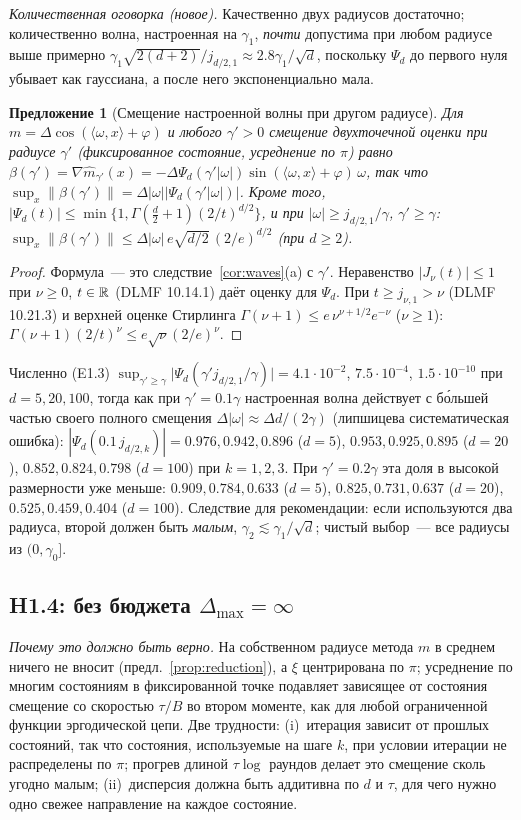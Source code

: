 \documentclass[11pt,a4paper]{article}
\numberwithin{equation}{section}
\newtheorem{proposition}[theorem]{Предложение}
\theoremstyle{definition}
\theoremstyle{remark}
\newcommand{\norm}[1]{\lVert #1\rVert}\newcommand{\abs}[1]{\lvert #1\rvert}\newcommand{\ip}[2]{\langle #1,#2\rangle}
\newcommand{\Dmax}{\Delta_{\max}}\newcommand{\Dcp}{\Delta_{\rm cp}}
\begin{document}
\emph{Количественная оговорка (новое).} Качественно двух радиусов достаточно; количественно волна, настроенная на $\gamma_1$, \emph{почти} допустима при любом радиусе выше примерно $\gamma_1\sqrt{2(d+2)}/j_{d/2,1}\approx2.8\gamma_1/\sqrt d$, поскольку $\Psi_d$ до первого нуля убывает как гауссиана, а после него экспоненциально мала.
\begin{proposition}[Смещение настроенной волны при другом радиусе]\label{prop:quant}
Для $m=\Delta\cos(\ip\omega x+\varphi)$ и любого $\gamma'>0$ смещение двухточечной оценки при радиусе $\gamma'$ (фиксированное состояние, усреднение по $\pi$) равно $\beta(\gamma')=\nabla\hat m_{\gamma'}(x)=-\Delta\Psi_d(\gamma'|\omega|)\sin(\ip\omega x+\varphi)\,\omega$, так что $\sup_x\norm{\beta(\gamma')}=\Delta|\omega|\abs{\Psi_d(\gamma'|\omega|)}$. Кроме того, $\abs{\Psi_d(t)}\le\min\{1,\Gamma(\frac d2+1)(2/t)^{d/2}\}$, и при $|\omega|\ge j_{d/2,1}/\gamma$, $\gamma'\ge\gamma$:
$\sup_x\norm{\beta(\gamma')}\le\Delta|\omega|\,e\sqrt{d/2}\,(2/e)^{d/2}$ (при $d\ge2$).
\end{proposition}
\begin{proof}
Формула~--- это следствие~\ref{cor:waves}(a) с $\gamma'$. Неравенство $\abs{J_\nu(t)}\le1$ при $\nu\ge0$, $t\in\mathbb R$ (DLMF 10.14.1) даёт оценку для $\Psi_d$. При $t\ge j_{\nu,1}>\nu$ (DLMF 10.21.3) и верхней оценке Стирлинга $\Gamma(\nu+1)\le e\,\nu^{\nu+1/2}e^{-\nu}$ ($\nu\ge1$): $\Gamma(\nu+1)(2/t)^\nu\le e\sqrt\nu(2/e)^\nu$.
\end{proof}
Численно (E1.3) $\sup_{\gamma'\ge\gamma}\abs{\Psi_d(\gamma'j_{d/2,1}/\gamma)}=4.1\cdot10^{-2}$, $7.5\cdot10^{-4}$, $1.5\cdot10^{-10}$ при $d=5,20,100$, тогда как при $\gamma'=0.1\gamma$ настроенная волна действует с бо́льшей частью своего полного смещения $\Delta|\omega|\approx\Delta d/(2\gamma)$ (липшицева систематическая ошибка): $|\Psi_d(0.1\,j_{d/2,k})|=0.976,0.942,0.896$ ($d=5$), $0.953,0.925,0.895$ ($d=20$), $0.852,0.824,0.798$ ($d=100$) при $k=1,2,3$. При $\gamma'=0.2\gamma$ эта доля в высокой размерности уже меньше: $0.909,0.784,0.633$ ($d=5$), $0.825,0.731,0.637$ ($d=20$), $0.525,0.459,0.404$ ($d=100$). Следствие для рекомендации: если используются два радиуса, второй должен быть \emph{малым}, $\gamma_2\lesssim\gamma_1/\sqrt d$; чистый выбор~--- все радиусы из $(0,\gamma_0]$.

\subsection{H1.4: без бюджета $\Dmax=\infty$}
\emph{Почему это должно быть верно.} На собственном радиусе метода $m$ в среднем ничего не вносит (предл.~\ref{prop:reduction}), а $\xi$ центрирована по $\pi$; усреднение по многим состояниям в фиксированной точке подавляет зависящее от состояния смещение со скоростью $\tau/B$ во втором моменте, как для любой ограниченной функции эргодической цепи. Две трудности: (i)~итерация зависит от прошлых состояний, так что состояния, используемые на шаге $k$, при условии итерации не распределены по $\pi$; прогрев длиной $\tau\log$ раундов делает это смещение сколь угодно малым; (ii)~дисперсия должна быть аддитивна по $d$ и $\tau$, для чего нужно одно свежее направление на каждое состояние.
\end{document}
